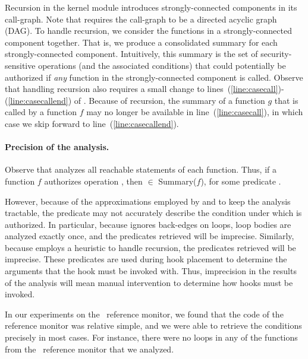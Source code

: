 Recursion in the kernel module introduces strongly-connected components in its
call-graph. Note that  requires the call-graph to
be a directed acyclic graph (DAG). To handle recursion, we consider the
functions in a strongly-connected component together.  That is, we produce a
consolidated summary for each strongly-connected component. Intuitively, this
summary is the set of security-sensitive operations (and the associated
conditions) that could potentially be authorized if \textit{any} function in
the strongly-connected component is called.  Observe that handling recursion
also requires a small change to
lines~(\ref{line:casecall})-(\ref{line:casecallend}) of
.  Because of recursion, the summary of a
function $g$ that is called by a function $f$ may no longer be available in
line~(\ref{line:casecall}), in which case we skip forward to
line~(\ref{line:casecallend}).


\paragraph{Precision of the analysis.} Observe that
 analyzes all reachable statements of each
function. Thus, if a function $f$ authorizes operation , then
 $\in$ \textsf{Summary}($f$), for some predicate .

However, because of the approximations employed by
 and  to keep the
analysis tractable, the predicate  may not accurately describe the
condition under which  is authorized. In particular, because
 ignores back-edges on loops, loop bodies are
analyzed exactly once, and the predicates retrieved will be imprecise.
Similarly, because  employs a heuristic to
handle recursion, the predicates retrieved will be imprecise.  These predicates
are used during hook placement to determine the arguments that the hook must be
invoked with. Thus, imprecision in the results of the analysis will mean manual
intervention to determine how hooks must be invoked.  

In our experiments on the \selinux\ reference monitor, we found that the code
of the reference monitor was relative simple, and we were able to retrieve the
conditions precisely in most cases. For instance, there were no loops in any of
the functions from the \selinux\ reference monitor that we analyzed.


